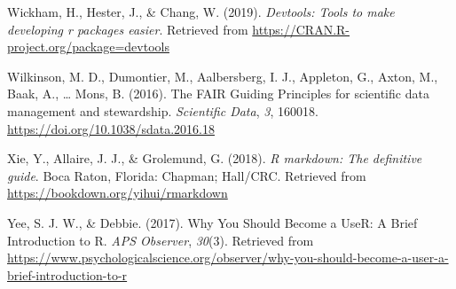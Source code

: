 \documentclass[
  english,
  jou,floatsintext]{apa6}
\newlength{\cslhangindent}
\newenvironment{cslreferences}%
  {\setlength{\parindent}{0pt}%
  \everypar{\setlength{\hangindent}{\cslhangindent}}\ignorespaces}%
  {\par}
\begin{document}
\begin{cslreferences}
\leavevmode\hypertarget{ref-R-devtools}{}%
Wickham, H., Hester, J., \& Chang, W. (2019). \emph{Devtools: Tools to make developing r packages easier}. Retrieved from \url{https://CRAN.R-project.org/package=devtools}

\leavevmode\hypertarget{ref-WilkinsonFAIRGuidingPrinciples2016}{}%
Wilkinson, M. D., Dumontier, M., Aalbersberg, I. J., Appleton, G., Axton, M., Baak, A., \ldots{} Mons, B. (2016). The FAIR Guiding Principles for scientific data management and stewardship. \emph{Scientific Data}, \emph{3}, 160018. \url{https://doi.org/10.1038/sdata.2016.18}

\leavevmode\hypertarget{ref-R-rmarkdown}{}%
Xie, Y., Allaire, J. J., \& Grolemund, G. (2018). \emph{R markdown: The definitive guide}. Boca Raton, Florida: Chapman; Hall/CRC. Retrieved from \url{https://bookdown.org/yihui/rmarkdown}

\leavevmode\hypertarget{ref-yee_why_2017}{}%
Yee, S. J. W., \& Debbie. (2017). Why You Should Become a UseR: A Brief Introduction to R. \emph{APS Observer}, \emph{30}(3). Retrieved from \url{https://www.psychologicalscience.org/observer/why-you-should-become-a-user-a-brief-introduction-to-r}
\end{cslreferences}

\endgroup
\end{document}
